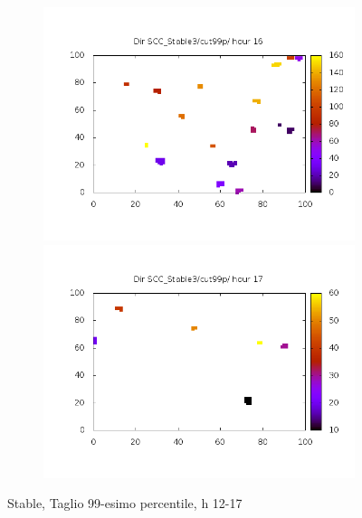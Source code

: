 \documentclass[10pt,a4paper]{article}
\begin{document}
\begin{figure}
\begin{subfigure}[b]{1\textwidth}
\includegraphics[scale=.4]{./img/SCC_Stable3/cut99p/16.png}
\includegraphics[scale=.4]{./img/SCC_Stable3/cut99p/17.png}
\end{subfigure}
\caption{Stable, Taglio 99-esimo percentile, h 12-17}
\label{stable-99-1217}
\end{figure}
\end{document}
